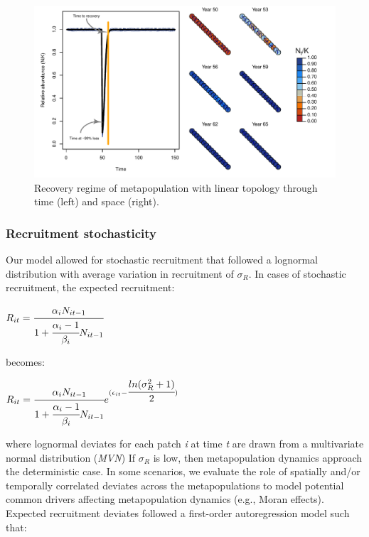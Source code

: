 \documentclass[]{article}
\begin{document}
\begin{figure}[H]

{\centering \includegraphics{Managing_for_ecological_surprises_in_metapopulations_makeHTML_files/figure-latex/example disturbance regime-1} 

}

\caption{Recovery regime of metapopulation with linear topology through time (left) and space (right).}\label{fig:example disturbance regime}
\end{figure}

\hypertarget{recruitment-stochasticity}{%
\subsubsection{Recruitment
stochasticity}\label{recruitment-stochasticity}}

Our model allowed for stochastic recruitment that followed a lognormal
distribution with average variation in recruitment of \(\sigma_R\). In
cases of stochastic recruitment, the expected recruitment:

\(R_{it}=\cfrac{\alpha_iN_{it-1}}{1+\cfrac{\alpha_i-1}{\beta_i}N_{it-1}}\)

becomes:

\(R_{it}=\cfrac{\alpha_iN_{it-1}}{1+\cfrac{\alpha_i-1}{\beta_i}N_{it-1}}e^{(\epsilon_{it}-\cfrac{ln(\sigma_{R}^2+1)}{2})}\)

where lognormal deviates for each patch \emph{i} at time \emph{t} are
drawn from a multivariate normal distribution (\emph{MVN}) If
\(\sigma_R\) is low, then metapopulation dynamics approach the
deterministic case. In some scenarios, we evaluate the role of spatially
and/or temporally correlated deviates across the metapopulations to
model potential common drivers affecting metapopulation dynamics (e.g.,
Moran effects). Expected recruitment deviates followed a first-order
autoregression model such that:
\end{document}
